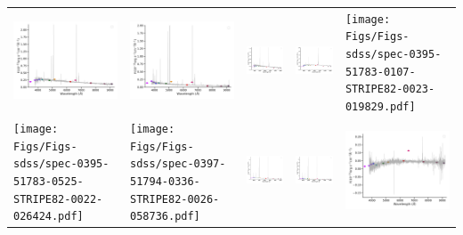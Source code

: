 \begin{center}
\begin{longtable}{l l l l l }
    \includegraphics[width=0.19\linewidth, clip]{Figs/Figs-sdss/spec-0391-51782-0125-STRIPE82-0011-016278.pdf} & \includegraphics[width=0.19\linewidth, clip]{Figs/Figs-sdss/spec-0391-51782-0394-STRIPE82-0010-016724.pdf} & \includegraphics[width=0.19\linewidth, clip]{Figs/Figs-sdss/spec-0391-51782-0625-STRIPE82-0014-009267.pdf} & \includegraphics[width=0.19\linewidth, clip]{Figs/Figs-sdss/spec-0392-51793-0583-STRIPE82-0016-049657.pdf} & \texttt{[image: Figs/Figs-sdss/spec-0395-51783-0107-STRIPE82-0023-019829.pdf]} \\
    \texttt{[image: Figs/Figs-sdss/spec-0395-51783-0525-STRIPE82-0022-026424.pdf]} & \texttt{[image: Figs/Figs-sdss/spec-0397-51794-0336-STRIPE82-0026-058736.pdf]} & \includegraphics[width=0.19\linewidth, clip]{Figs/Figs-sdss/spec-0287-52023-0466-SPLUS-n01s25-028549.pdf} & \includegraphics[width=0.19\linewidth, clip]{Figs/Figs-sdss/spec-0330-52370-0439-SPLUS-n03s21-047308.pdf} & \includegraphics[width=0.19\linewidth, clip]{Figs/Figs-sdss/spec-0376-52143-0086-STRIPE82-0139-018589.pdf} \\

\end{longtable}
\end{center}
